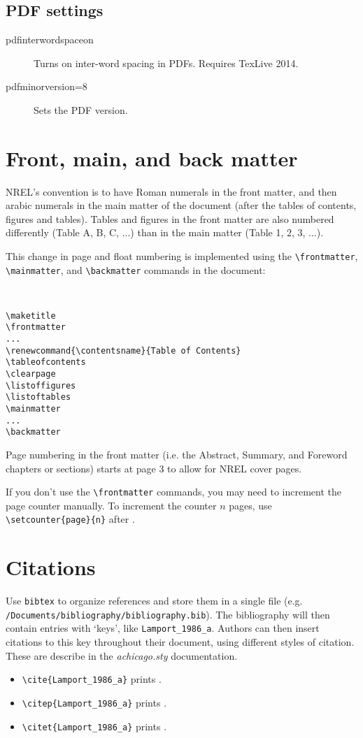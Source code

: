 \subsection{PDF settings}
\begin{description}
\item[pdfinterwordspaceon]{Turns on inter-word spacing in PDFs. Requires TexLive 2014.}
\item[pdfminorversion=8]{Sets the PDF version.}
\end{description}

\section{Front, main, and back matter}
NREL's convention is to have Roman numerals in the front matter, and then arabic numerals in the main matter of the document (after the tables of contents, figures and tables). Tables and figures in the front matter are also numbered differently (Table A, B, C, ...) than in the main matter (Table 1, 2, 3, ...).

This change in page and float numbering is implemented using the \verb+\frontmatter+, \verb+\mainmatter+, and \verb+\backmatter+ commands in the document:

\begin{verbatim}


\maketitle
\frontmatter
...
\renewcommand{\contentsname}{Table of Contents}
\tableofcontents
\clearpage
\listoffigures
\listoftables
\mainmatter
...
\backmatter

\end{verbatim}

Page numbering in the front matter (i.e. the Abstract, Summary, and Foreword chapters or sections) starts at page 3 to allow for NREL cover pages.

If you don't use the \verb+\frontmatter+ commands, you may need to increment the page counter manually. To increment the counter $n$ pages, use \verb+\setcounter{page}{n}+ after \verb++.

\section{Citations}
\label{Sec:Bib}
Use \texttt{bibtex} to organize references and store them in a single file (e.g. \verb+/Documents/bibliography/bibliography.bib+). The bibliography will then contain entries with `keys', like \texttt{Lamport\_1986\_a}. Authors can then insert citations to this key throughout their document, using different styles of citation. These are describe in the \emph{achicago.sty} documentation.
\begin{itemize}
\item \verb+\cite{Lamport_1986_a}+ prints \cite{Lamport_1986_a}.
\item \verb+\citep{Lamport_1986_a}+ prints \citep{Lamport_1986_a}.
\item \verb+\citet{Lamport_1986_a}+ prints \citet{Lamport_1986_a}.
\end{itemize}


